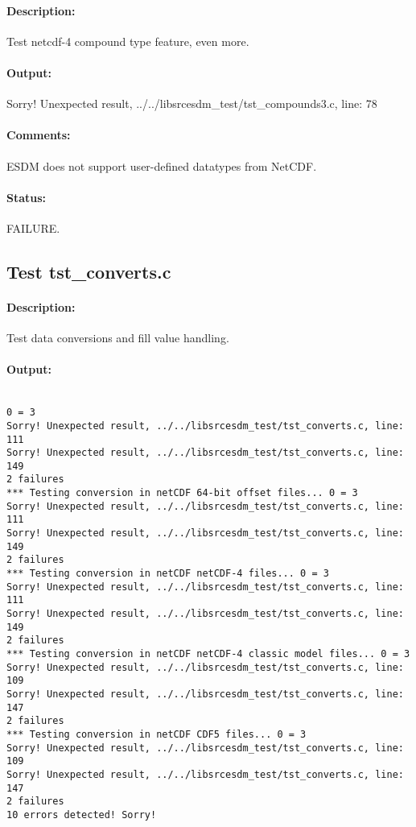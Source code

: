 \paragraph{Description:} Test netcdf-4 compound type feature, even more.

\paragraph{Output:} Sorry! Unexpected result, ../../libsrcesdm\_test/tst\_compounds3.c, line: 78

\paragraph{Comments:} ESDM does not support user-defined datatypes from NetCDF.

\paragraph{Status:} FAILURE.

\subsection{Test tst\_converts.c}

\paragraph{Description:} Test data conversions and fill value handling.

\paragraph{Output:}

\begin{verbatim}

0 = 3
Sorry! Unexpected result, ../../libsrcesdm_test/tst_converts.c, line: 111
Sorry! Unexpected result, ../../libsrcesdm_test/tst_converts.c, line: 149
2 failures
*** Testing conversion in netCDF 64-bit offset files... 0 = 3
Sorry! Unexpected result, ../../libsrcesdm_test/tst_converts.c, line: 111
Sorry! Unexpected result, ../../libsrcesdm_test/tst_converts.c, line: 149
2 failures
*** Testing conversion in netCDF netCDF-4 files... 0 = 3
Sorry! Unexpected result, ../../libsrcesdm_test/tst_converts.c, line: 111
Sorry! Unexpected result, ../../libsrcesdm_test/tst_converts.c, line: 149
2 failures
*** Testing conversion in netCDF netCDF-4 classic model files... 0 = 3
Sorry! Unexpected result, ../../libsrcesdm_test/tst_converts.c, line: 109
Sorry! Unexpected result, ../../libsrcesdm_test/tst_converts.c, line: 147
2 failures
*** Testing conversion in netCDF CDF5 files... 0 = 3
Sorry! Unexpected result, ../../libsrcesdm_test/tst_converts.c, line: 109
Sorry! Unexpected result, ../../libsrcesdm_test/tst_converts.c, line: 147
2 failures
10 errors detected! Sorry!

\end{verbatim}

